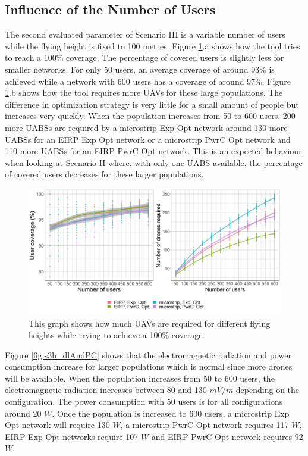 \subsection{Influence of the Number of Users}
\label{S3B}
The second evaluated parameter of Scenario III is a variable number of users while the flying height is fixed to 100 metres.  
Figure \ref{fig:s3b_numdronesAndCov}.a shows how the tool tries to reach a 100\% coverage. The percentage
of covered users is slightly less for smaller networks. For only 50 users, an average 
coverage of around 93\% is achieved while a network with 600 users has a coverage of around 97\%.
Figure \ref{fig:s3b_numdronesAndCov}.b shows how the tool requires more \gls{UAV}s for these large 
populations. 
The difference in optimization strategy is very little for a small amount of people but increases very quickly. 
When the population increases from 50 to 600 users,
 200 more \gls{UABS}s are required by a microstrip \gls{Exp Opt} network 
 around 130 more \gls{UABS}s for an \gls{EIRP} \gls{Exp Opt} network or a microstrip \gls{PwrC Opt} network
 and 110 more \gls{UABS}s for an \gls{EIRP} \gls{PwrC Opt} network.
This is an expected behaviour  when looking at Scenario II where, with only one \gls{UABS} available, 
the percentage of covered users decreases for these larger populations.
\clearpage
\begin{figure}[h]
  \includegraphics[width=\textwidth]{../results/s3/uvsnumdronesAndCov.png}
  \caption{This graph shows how much \acs{UAV}s are required for different flying heights while trying to achieve a 100\% coverage.}
  \label{fig:s3b_numdronesAndCov}
\end{figure}

Figure \ref{fig:s3b_dlAndPC} shows that the electromagnetic radiation and power consumption increase for larger 
populations which is normal since more drones will be available.
When the population increases from 50 to 600 users, the electromagnetic radiation increases 
between 80 and 130 $mV/m$ depending on the configuration. The power consumption with 50 users is for all configurations around 
20 $W$. Once the population is increased to 600 users, a microstrip \gls{Exp Opt} network will require 130 $W$, 
 a microstrip \gls{PwrC Opt} network requires 117 $W$,
\gls{EIRP} \gls{Exp Opt} networks require 107 $W$ and \gls{EIRP} \gls{PwrC Opt} network requires 92 $W$.

